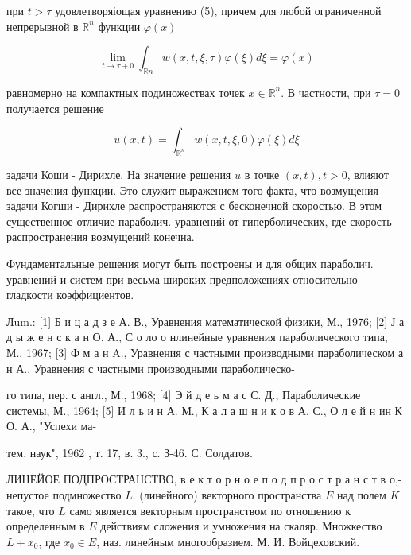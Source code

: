 \documentclass[10pt]{article}
\begin{document}
при $t>\tau$ удовлетворяіощая уравнению (5), причем для любой ограниченной непрерывной в $\mathbb{R}^{n}$ функции $\varphi(x)$



\[

\lim _{t \rightarrow \tau+0} \int_{\mathbb{R} n} w(x, t, \xi, \tau) \varphi(\xi) d \xi=\varphi(x)

\]



равномерно на компактных подмножествах точек $x \in \mathbb{R}^{n}$. В частности, при $\tau=0$ получается решение



\[

u(x, t)=\int_{\mathbb{R}^{n}} w(x, t, \xi, 0) \varphi(\xi) d \xi

\]



задачи Коши - Дирихле. На значение решения $u$ в точке $(x, t), t>0$, влияют все значения функции. Это служит выражением того факта, что возмущения задачи Когши - Дирихле распространяются с бесконечной скоростью. В этом существенное отличие параболич. уравнений от гиперболических, где скорость распространения возмущений конечна.



Фундаментальные решения могут быть построены и для общих параболич. уравнений и систем при весьма широких предположениях относительно гладкости коәффициентов.



Лum.: [1] Б и ц а д з е А. В., Уравнения математической физики, М., 1976; [2] Ј а д ы ж е н с к а н О. А., С о ло о нлинейные уравнения параболического типа, М., 1967; [3] Ф м а н A., Уравнения с частными производными параболическом а н А., Уравнения с частными производными параболическо-

го типа, пер. с англ., М., 1968; [4] Э й д е ь м а с С. Д., Параболические системы, М., 1964; [5] И л ь и н А. М., К а л а ш н и к о в А. С., О л е й н ин К О. А., "Успехи ма-

тем. наук", 1962 , т. 17, в. 3., с. З-46. С. Солдатов.



ЛИНЕЙОЕ ПОДПРОСТРАНСТВО, в е к т о р н о е п о д п р о с т р а н с т в о,- непустое подмножество $L$. (линейного) векторного пространства $E$ над полем $K$ такое, что $L$ само является векторным пространством по отношению к определенным в $E$ действиям сложения и умножения на скаляр. Множкество $L+x_{0}$, где $x_{0} \in E$, наз. линейным многообразием. М. И. Войцеховский.
\end{document}
